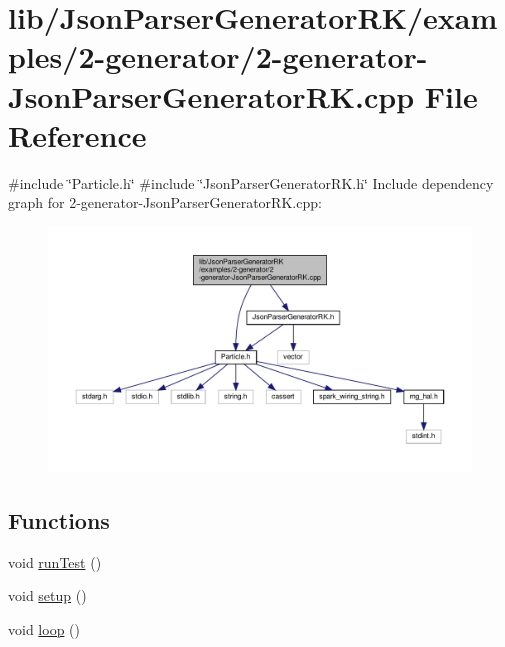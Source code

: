 \hypertarget{2-generator-_json_parser_generator_r_k_8cpp}{}\section{lib/\+Json\+Parser\+Generator\+R\+K/examples/2-\/generator/2-\/generator-\/\+Json\+Parser\+Generator\+RK.cpp File Reference}
\label{2-generator-_json_parser_generator_r_k_8cpp}
{\ttfamily \#include \char`\"{}Particle.\+h\char`\"{}}\newline
{\ttfamily \#include \char`\"{}Json\+Parser\+Generator\+R\+K.\+h\char`\"{}}\newline
Include dependency graph for 2-\/generator-\/\+Json\+Parser\+Generator\+RK.cpp\+:
\nopagebreak
\begin{figure}[H]
\begin{center}
\leavevmode
\includegraphics[width=350pt]{2-generator-_json_parser_generator_r_k_8cpp__incl}
\end{center}
\end{figure}
\subsection*{Functions}
\begin{DoxyCompactItemize}
\item 
void \hyperlink{2-generator-_json_parser_generator_r_k_8cpp_a822f652c6fc2f163c182a6e5fe922c23}{run\+Test} ()
\item 
void \hyperlink{2-generator-_json_parser_generator_r_k_8cpp_a4fc01d736fe50cf5b977f755b675f11d}{setup} ()
\item 
void \hyperlink{2-generator-_json_parser_generator_r_k_8cpp_afe461d27b9c48d5921c00d521181f12f}{loop} ()
\end{DoxyCompactItemize}
